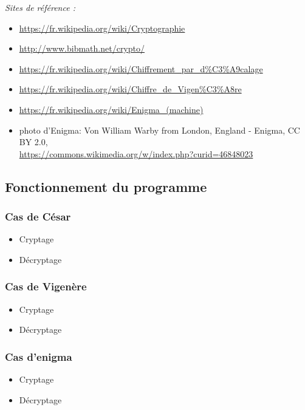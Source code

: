 \documentclass[a4paper,12pt,abstracton,titlepage]{scrartcl}
\begin{document}
\textit{Sites de référence :}
\begin{itemize}
\item \url{https://fr.wikipedia.org/wiki/Cryptographie}
\item \url{http://www.bibmath.net/crypto/}
\item \url{https://fr.wikipedia.org/wiki/Chiffrement_par_d\%C3\%A9calage}
\item \url{https://fr.wikipedia.org/wiki/Chiffre_de_Vigen\%C3\%A8re}
\item \url{https://fr.wikipedia.org/wiki/Enigma_(machine)}
\item photo d’Enigma:
Von William Warby from London, England - Enigma, CC BY 2.0,\\\url{https://commons.wikimedia.org/w/index.php?curid=46848023}\\
\end{itemize}

\newpage
\subsection{Fonctionnement du programme}
\subsubsection{Cas de César}
\begin{itemize}
\item Cryptage
\item Décryptage
\end{itemize}
\subsubsection{Cas de Vigenère}
\begin{itemize}
\item Cryptage
\item Décryptage
\end{itemize}
\subsubsection{Cas d’enigma}
\begin{itemize}
\item Cryptage
\item Décryptage
\end{itemize}
\end{document}
